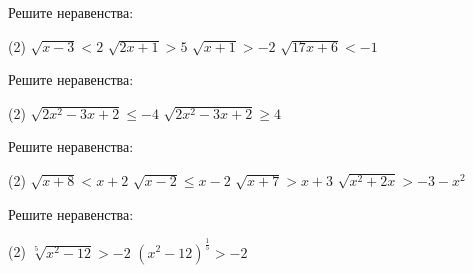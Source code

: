 %
%

\begin{class}[number=1]
	\begin{listofex}
		\item Решите неравенства:
		\begin{tasks}(2)
			\task \( \sqrt{x-3}<2 \)
			\task \( \sqrt{2x+1}>5 \)
			\task \( \sqrt{x+1}>-2 \)
			\task \( \sqrt{17x+6}<-1 \)
		\end{tasks}
		\item Решите неравенства:
		\begin{tasks}(2)
			\task \( \sqrt{2x^2-3x+2}\le-4 \)
			\task \( \sqrt{2x^2-3x+2}\ge4 \)
		\end{tasks}
		\item Решите неравенства:
		\begin{tasks}(2)
			\task \( \sqrt{x+8}<x+2 \)
			\task \( \sqrt{x-2}\le x-2 \)
			\task \( \sqrt{x+7}>x+3 \)
			\task \( \sqrt{x^2+2x}>-3-x^2 \)
		\end{tasks}
		\item Решите неравенства:
		\begin{tasks}(2)
			\task \( \sqrt[5]{x^2-12}>-2 \)
			\task \( (x^2-12)^{\tfrac{1}{5}}>-2 \)
		\end{tasks}
	\end{listofex}
\end{class}

\begin{homework}[number=1]
	\begin{listofex}
		\item 
		\begin{tasks}
			\task \(  \)
			\task \(  \)
			\task \(  \)
			\task \(  \)
		\end{tasks}
	\end{listofex}
\end{homework}

